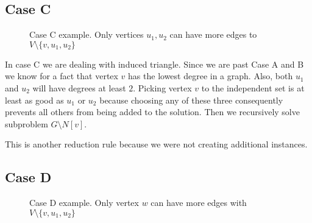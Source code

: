 \subsection{Case C}
\begin{figure}[ht]
    \centering{}
    \caption{Case C example. Only vertices $u_1, u_2$ can have more edges to $V\setminus \{v,u_1,u_2\}$}
    \label{case c}
\end{figure}

In case C we are dealing with induced triangle. Since we are past Case A and B we know for a fact that vertex $v$ has the lowest degree in a graph. Also, both $u_1$ and $u_2$ will have degrees at least $2$. Picking vertex $v$ to the independent set is at least as good as $u_1$ or $u_2$ because choosing any of these three consequently prevents all others from being added to the solution. Then we recursively solve subproblem $G\setminus N[v]$.

This is another reduction rule because we were not creating additional instances.

\subsection{Case D}
\begin{figure}[ht]
    \centering{}
    \caption{Case D example. Only vertex $w$ can have more edges with $V\setminus \{v,u_1,u_2\}$}
    \label{case d}
\end{figure}

